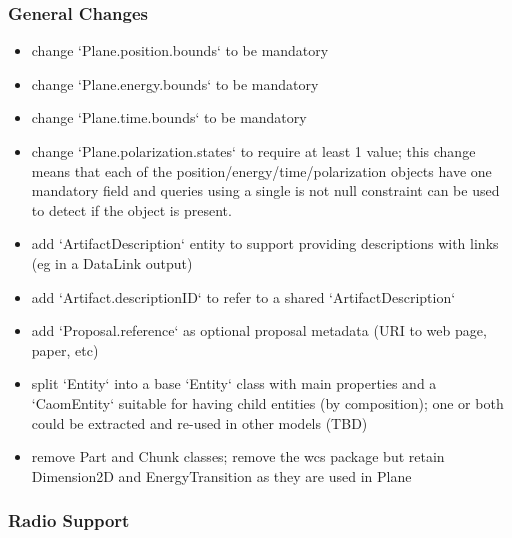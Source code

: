 \documentclass[11pt,a4paper]{ivoa}
\begin{document}
\subsubsection{General Changes}
\begin{itemize}
\item change `Plane.position.bounds` to be mandatory

\item change `Plane.energy.bounds` to be mandatory

\item change `Plane.time.bounds` to be mandatory

\item change `Plane.polarization.states` to require at least 1 value; this change
means that each of the position/energy/time/polarization objects 
have one mandatory field and queries using a single is not null constraint
can be used to detect if the object is present.

\item add `ArtifactDescription` entity to support providing descriptions with links 
(eg in a DataLink output)

\item add `Artifact.descriptionID` to refer to a shared `ArtifactDescription`

\item add `Proposal.reference` as optional proposal metadata (URI to web page, paper, etc)

\item split `Entity` into a base `Entity` class with main properties and a `CaomEntity` 
suitable for having child entities (by composition); one or both could be extracted 
and re-used in other models (TBD)

\item remove Part and Chunk classes; remove the wcs package but retain Dimension2D and 
EnergyTransition as they are used in Plane
\end{itemize}

\subsubsection{Radio Support}
\end{document}
